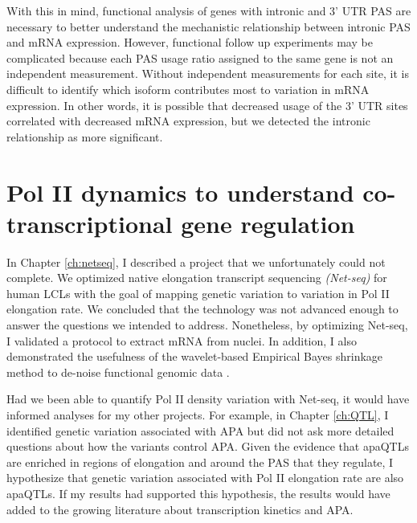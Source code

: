 With this in mind, functional analysis of genes with intronic and 3' UTR PAS are necessary to better understand the mechanistic relationship between intronic PAS and mRNA expression. However, functional follow up experiments may be complicated because each PAS usage ratio assigned to the same gene is not an independent measurement. Without independent measurements for each site, it is difficult to identify which isoform contributes most to variation in mRNA expression. In other words, it is possible that decreased usage of the 3' UTR sites correlated with decreased mRNA expression, but we detected the intronic relationship as more significant. 


\section{Pol II dynamics to understand co-transcriptional gene regulation}

In Chapter \ref{ch:netseq}, I described a project that we unfortunately could not complete. We optimized native elongation transcript sequencing \emph{(Net-seq)} for human LCLs with the goal of mapping genetic variation to variation in Pol II elongation rate. We concluded that the technology was not advanced enough to answer the questions we intended to address. Nonetheless, by optimizing Net-seq, I validated a protocol to extract mRNA from nuclei. In addition, I also demonstrated the usefulness of the wavelet-based Empirical Bayes shrinkage method to de-noise functional genomic data \citep{xing_flexible_2016}. 

Had we been able to quantify Pol II density variation with Net-seq, it would have informed analyses for my other projects. For example, in Chapter \ref{ch:QTL}, I identified genetic variation associated with APA but did not ask more detailed questions about how the variants control APA. Given the evidence that apaQTLs are enriched in regions of elongation and around the PAS that they regulate, I hypothesize that genetic variation associated with Pol II elongation rate are also apaQTLs. If my results had supported this hypothesis, the results would have added to the growing literature about transcription kinetics and APA.

